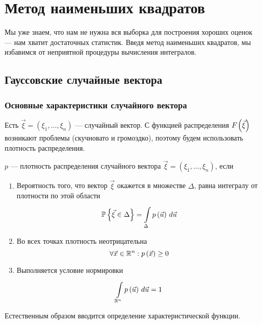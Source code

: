 \chapter{Метод наименьших квадратов}
Мы уже знаем, что нам не нужна вся выборка для построения хороших оценок ---
нам хватит достаточных статистик. Введя метод наименьших квадратов,
мы избавимся от неприятной процедуры вычисления интегралов.

\section{Гауссовские случайные вектора}

\subsection{Основные характеристики случайного вектора}

Есть $\vec{\xi} = \left( \xi_1, \dots, \xi_n \right)$ --- случайный вектор.
С функцией распределения $\cdf{\vec{\xi}}$ возникают проблемы (скучновато и
громоздко), поэтому будем использовать плотность распределения.

\begin{definition}
    $p$ --- плотность распределения случайного вектора
    $\vec{\xi} = \left( \xi_1, \dots, \xi_n \right)$, если
    \begin{enumerate}
        \item Вероятность того, что вектор $\vec{\xi}$ окажется
            в множестве $\Delta$, равна интегралу от плотности по этой области
            $$\Probability{\vec{\xi} \in \Delta}
                = \integrall{\Delta}{d\vec{u}}{\pdf{\vec{u}}}$$
        \item Во всех точках плотность неотрицательна
            $$\forall \vec{x} \in \mathbb{R}^n: \pdf{\vec{x}} \ge 0$$
        \item Выполняется условие нормировки
            $$\integrall{\mathbb{R}^n}{d\vec{u}}{\pdf{\vec{u}}} = 1$$
    \end{enumerate}
\end{definition}

Естественным образом вводится определение характеристической функции.

